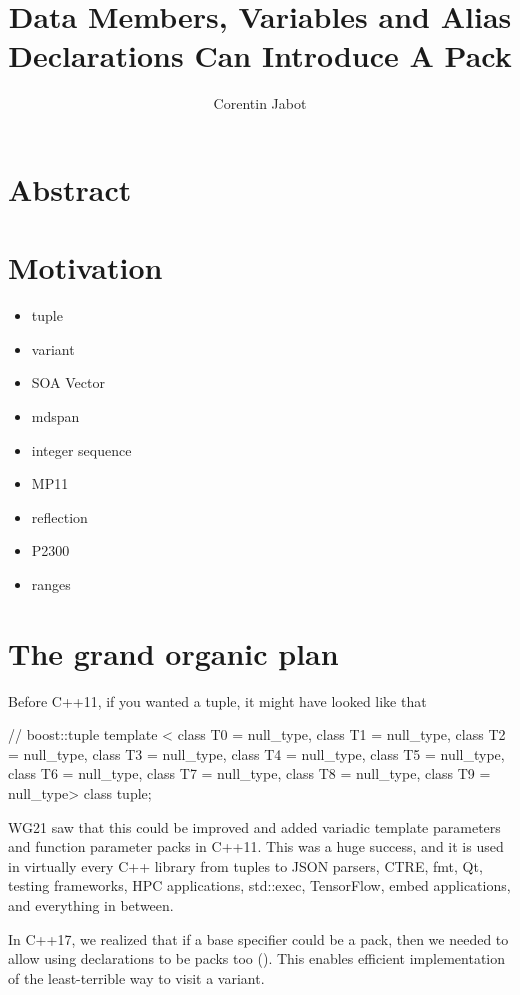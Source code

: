 \documentclass{wg21}
\title{Data Members, Variables and Alias Declarations Can Introduce A Pack}
\author{Corentin Jabot}{corentin.jabot@gmail.com}
\begin{document}
\maketitle

\section{Abstract}

\section{Motivation}

\begin{itemize}
    \item tuple
    \item variant
    \item SOA Vector
    \item mdspan
    \item integer sequence
    \item MP11
    \item reflection
    \item P2300
    \item ranges
\end{itemize}

\section{The grand organic plan}

Before C++11, if you wanted a tuple, it might have looked like that
\begin{colorblock}
// boost::tuple
template <
class T0 = null_type, class T1 = null_type, class T2 = null_type,
class T3 = null_type, class T4 = null_type, class T5 = null_type,
class T6 = null_type, class T7 = null_type, class T8 = null_type,
class T9 = null_type>
class tuple;
\end{colorblock}

WG21 saw that this could be improved and  added variadic template parameters and function parameter packs in C++11.
This was a huge success, and it is used in virtually every C++ library from tuples to JSON parsers, CTRE, fmt, Qt, testing frameworks,
HPC applications, std::exec, TensorFlow, embed applications, and everything in between.

In C++17, we realized that if a base specifier could be a pack, then we needed to allow using declarations to be packs too ().
This enables efficient implementation of the least-terrible way to visit a variant.
\end{document}
